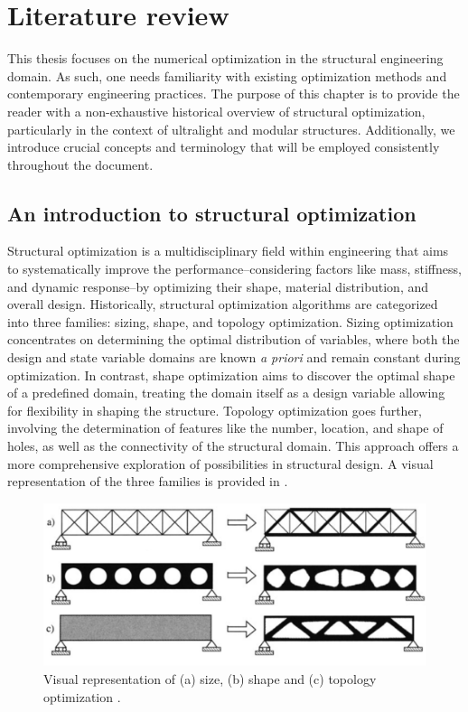 \setchapterpreamble[u]{\margintoc}
\glsresetall %

\chapter{Literature review}
This thesis focuses on the numerical optimization in the structural engineering domain. As such, one needs familiarity with existing optimization methods and contemporary engineering practices. The purpose of this chapter is to provide the reader with a non-exhaustive historical overview of structural optimization, particularly in the context of ultralight and modular structures. Additionally, we introduce crucial concepts and terminology that will be employed consistently throughout the document.

\section{An introduction to structural optimization}
Structural optimization is a multidisciplinary field within engineering that aims to systematically improve the performance--considering factors like mass, stiffness, and dynamic response--by optimizing their shape, material distribution, and overall design. Historically, structural optimization algorithms are categorized into three families: sizing, shape, and topology optimization. Sizing optimization concentrates on determining the optimal distribution of variables, where both the design and state variable domains are known \textit{a priori} and remain constant during optimization. In contrast, shape optimization aims to discover the optimal shape of a predefined domain, treating the domain itself as a design variable allowing for flexibility in shaping the structure. Topology optimization goes further, involving the determination of features like the number, location, and shape of holes, as well as the connectivity of the structural domain. This approach offers a more comprehensive exploration of possibilities in structural design. A visual representation of the three families is provided in .

\begin{figure}
    \centering
    \includegraphics[width=\linewidth]{figures/02_literature/opt_family.png}
    \caption{Visual representation of (a) size, (b) shape and (c) topology optimization \cite{bendsoe_topology_2004}.}
    \label{fig:02_opt_fam}
\end{figure}

